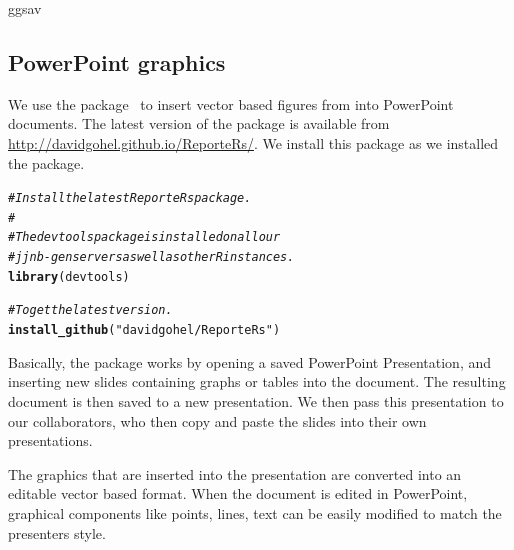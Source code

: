 \documentclass[nojss]{jss}\usepackage[]{graphicx}\usepackage[]{color}
\makeatletter
\newcommand{\hlstr}[1]{\textcolor[rgb]{0.192,0.494,0.8}{#1}}%
\newcommand{\hlcom}[1]{\textcolor[rgb]{0.678,0.584,0.686}{\textit{#1}}}%
\newcommand{\hlstd}[1]{\textcolor[rgb]{0.345,0.345,0.345}{#1}}%
\newcommand{\hlkwd}[1]{\textcolor[rgb]{0.737,0.353,0.396}{\textbf{#1}}}%
\newenvironment{kframe}{%
 \def\at@end@of@kframe{}%
 \ifinner\ifhmode%
  \def\at@end@of@kframe{\end{minipage}}%
  \begin{minipage}{\columnwidth}%
 \fi\fi%
 \def\FrameCommand##1{\hskip\@totalleftmargin \hskip-\fboxsep
 \colorbox{shadecolor}{##1}\hskip-\fboxsep
     \hskip-\linewidth \hskip-\@totalleftmargin \hskip\columnwidth}%
 \MakeFramed {\advance\hsize-\width
   \@totalleftmargin\z@ \linewidth\hsize
   \@setminipage}}%
 {\par\unskip\endMakeFramed%
 \at@end@of@kframe}
\newenvironment{knitrout}{}{} %
\makeatother
\begin{document}
ggsav
\subsection{PowerPoint graphics}
We use the  package~\citep{Gohel:2014} to insert vector based figures from  into PowerPoint documents. The latest version of the  package is available from \url{http://davidgohel.github.io/ReporteRs/}. We install this package as we installed the  package.
\begin{knitrout}\footnotesize
{}\color{fgcolor}\begin{kframe}
\begin{alltt}
\hlcom{# Install the latest ReporteRs package.}
\hlcom{#}
\hlcom{# The devtools package is installed on all our }
\hlcom{# jjnb-gen servers as well as other R instances.}
\hlkwd{library}\hlstd{(devtools)}

\hlcom{# To get the latest version.}
\hlkwd{install_github}\hlstd{(}\hlstr{"davidgohel/ReporteRs"}\hlstd{)}
\end{alltt}
\end{kframe}
\end{knitrout}

Basically, the package works by opening a saved PowerPoint Presentation, and inserting new slides containing graphs or tables into the document. The resulting document is then saved to a new presentation. We then pass this presentation to our collaborators, who then copy and paste the  slides into their own presentations. 

The  graphics that are inserted into the presentation are converted into an editable vector based format. When the document is edited in PowerPoint, graphical components like points, lines, text can be easily modified to match the presenters style.
\end{document}
